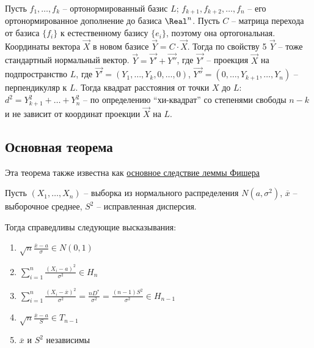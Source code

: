 \begin{MyProof}
    Пусть $f_1, \dots , f_k$ -- ортонормированный базис $L$;
    $f_{k+1}, f_{k+2}, \dots , f_n$ -- его ортонормированное дополнение до базиса $\Real^n$.
    Пусть $C$ -- матрица перехода от базиса $\{f_i\}$ к естественному базису $\{e_i\}$, поэтому она ортогональная.
    Координаты вектора $\vec X$ в новом базисе $\vec Y = C \cdot \vec X$. Тогда по свойству 5 $\vec Y$ -- тоже стандартный  нормальный вектор.
    $\vec Y = \vec {Y'} + \vec {Y''}$, где $\vec {Y'}$ -- проекция $\vec X$ на подпространство $L$,
    где $\vec {Y'} = (Y_1, \dots , Y_k, 0, \dots , 0)$, $\vec {Y''} = (0, \dots , Y_{k+1}, \dots , Y_n)$ -- перпендикуляр к $L$.
    Тогда квадрат расстояния от точки $X$ до $L$: $d^2 = Y_{k+1}^2 + \dots + Y_n^2$ -- по определению \enquote{хи-квадрат} со степенями свободы $n - k$
    и не зависит от координат проекции $\vec X$ на $L$. 
\end{MyProof}

\subsection{Основная теорема}

Эта теорема также известна как \href{https://tvims.nsu.ru/chernova/ms/lec/node37.html}{основное следствие леммы Фишера}

\begin{MyTheorem}
    \Ths Пусть $(X_1, \dots, X_n)$ -- выборка из нормального распределения $N(a, \sigma^2)$, $\overline{x}$ -- выборочное среднее, $S^2$ -- исправленная дисперсия.

    Тогда справедливы следующие высказывания:

    \begin{enumerate}
        \item $\sqrt{n} \frac{\overline{x} - a}{\sigma} \in N(0, 1)$
        
        \item $\sum_{i = 1}^n \frac{(X_i - a)^2}{\sigma^2} \in H_n$
        
        \item $\sum_{i = 1}^n \frac{(X_i - \overline{x})^2}{\sigma^2} = \frac{n D^*}{\sigma^2} = \frac{(n - 1) S^2}{\sigma^2} \in H_{n - 1}$

        \item $\sqrt{n} \frac{\overline{x} - a}{S} \in T_{n - 1}$
        
        \item $\overline{x}$ и $S^2$ независимы
    \end{enumerate}
\end{MyTheorem}

